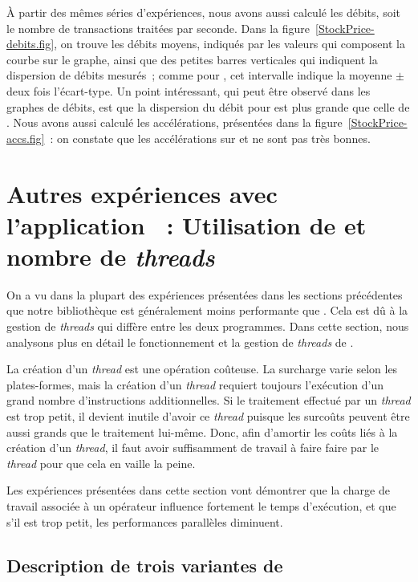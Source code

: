\`A partir des m\^emes s\'eries d'exp\'eriences, nous avons aussi calcul\'e les d\'ebits, soit le nombre de transactions trait\'ees par seconde. Dans la figure~\ref{StockPrice-debits.fig}, on trouve les d\'ebits moyens, indiqués par les valeurs qui composent la courbe sur le graphe, ainsi que des petites barres verticales qui indiquent la dispersion de débits mesurés~; comme pour , cet intervalle indique la moyenne $\pm$ deux fois l'écart-type. Un point int\'eressant, qui peut \^etre observ\'e dans les graphes de d\'ebits, est que la dispersion du d\'ebit pour  est plus grande que celle de . 
%
Nous avons aussi calculé les accélérations, présentées dans la
figure~\ref{StockPrice-accs.fig}~: on constate que les accélérations sur  et  ne sont pas très bonnes.

\section{Autres expériences avec l'application ~: Utilisation de  et nombre de \emph{threads}} 
\label{autres-experiences-wordcount.sect}

On a vu dans la plupart des exp\'eriences présentées dans les sections précédentes que notre biblioth\`eque  est généralement moins performante que . Cela est d\^u \`a la gestion de \emph{threads} qui diff\`ere entre les deux programmes. Dans cette section, nous analysons plus en détail le fonctionnement et la gestion de \emph{threads} de . 

La cr\'eation d'un \emph{thread} est une opération co\^uteuse. La surcharge varie selon les plates-formes, mais la cr\'eation d'un \emph{thread} requiert toujours l'exécution d'un grand nombre d'instructions additionnelles. Si le traitement effectué par un \emph{thread} est trop petit, il devient inutile d'avoir ce \emph{thread} puisque les surcoûts peuvent être aussi grands que le traitement lui-même. Donc, afin d'amortir les co\^uts li\'es \`a la cr\'eation d'un \emph{thread}, il faut avoir suffisamment de travail à faire faire par le \emph{thread} pour que cela en vaille la peine.

Les exp\'eriences présentées dans cette section vont d\'emontrer que la charge de travail associée à un opérateur influence fortement le temps d'ex\'ecution, et que s'il est trop petit, les performances parallèles diminuent.


\subsection{Description de trois variantes de }

